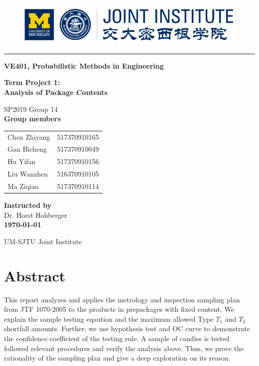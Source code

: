 \documentclass[a4paper]{article}
\begin{document}
\begin{titlepage}
\begin{figure}[!htbp]
\center
\includegraphics[width=12cm]{ji_logo.png}
\end{figure}
\noindent\rule[0.25\baselineskip]{\textwidth}{1pt}
\begin{center}
\Large{\bfseries  VE401, Probabilistic Methods in Engineering}
\vspace{1cm}

\Huge{\bfseries  Term Project 1:}\\
\Huge{\bfseries Analysis of Package Contents}

\vspace{1.5cm}

\Large SP2019  Group 14\\
\Large \textbf{Group members}\\

\begin{tabular}{l l}
Chen Zhiyang & 517370910165\\
Gan Bicheng & 517370910049\\
Hu Yifan & 517370910156\\
Liu Wanzhen & 516370910105\\
Ma Ziqiao & 517370910114\\
\end{tabular}

\vspace{1cm}
\Large \textbf{Instructed by}\\
\Large Dr. Horst Hohberger\\

\vspace{1cm}
{\bfseries \today}\\
\vspace{1cm}

UM-SJTU Joint Institute
\end{center}
\end{titlepage}
\section{Abstract}
This report analyzes and applies the metrology and inspection sampling plan from JTF 1070-2005 to the products in prepackages with fixed content. We explain the sample testing eqaution and the maximum allowed Type $T_{1}$ and $T_{2}$ shortfall amounts. Further, we use hypothesis test and OC curve to demonstrate the confidence coefficient of the testing rule. A sample of candies is tested followed relevant procedures and verify the analysis above. Thus, we prove the rationality of the sampling plan and give a deep exploration on its reason. 
\end{document}
